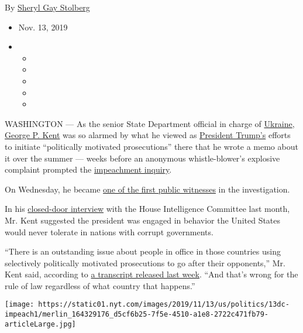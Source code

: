 By \href{https://www.nytimes.com/by/sheryl-gay-stolberg}{Sheryl Gay
Stolberg}

\begin{itemize}
\item
  Nov. 13, 2019
\item
  \begin{itemize}
  \item
  \item
  \item
  \item
  \item
  \end{itemize}
\end{itemize}

WASHINGTON --- As the senior State Department official in charge of
\href{https://www.nytimes.com/2019/11/13/us/politics/impeachment-hearings.html}{Ukraine},
\href{https://www.nytimes.com/2019/11/13/us/politics/impeachment-hearings.html}{George
P. Kent} was so alarmed by what he viewed as
\href{https://www.nytimes.com/2019/11/13/us/politics/impeachment-hearings.html}{President
Trump's} efforts to initiate ``politically motivated prosecutions''
there that he wrote a memo about it over the summer --- weeks before an
anonymous whistle-blower's explosive complaint prompted the
\href{https://www.nytimes.com/2019/11/13/us/politics/impeachment-hearing-day-1.html}{impeachment
inquiry}.

On Wednesday, he became
\href{https://www.nytimes.com/2019/11/13/us/politics/impeachment-hearings.html}{one
of the first public witnesses} in the investigation.

In his
\href{https://www.nytimes.com/2019/10/18/us/politics/hunter-biden-ukraine.html}{closed-door
interview} with the House Intelligence Committee last month, Mr. Kent
suggested the president was engaged in behavior the United States would
never tolerate in nations with corrupt governments.

``There is an outstanding issue about people in office in those
countries using selectively politically motivated prosecutions to go
after their opponents,'' Mr. Kent said, according to
\href{https://www.nytimes.com/interactive/2019/11/07/us/politics/george-kent-transcript.html}{a
transcript released last week}. ``And that's wrong for the rule of law
regardless of what country that happens.''

\href{https://www.nytimes.com/interactive/2019/11/13/us/politics/trump-impeachment.html}{}

\texttt{[image: https://static01.nyt.com/images/2019/11/13/us/politics/13dc-impeach1/merlin\_164329176\_d5cf6b25-7f5e-4510-a1e8-2722c471fb79-articleLarge.jpg]}

